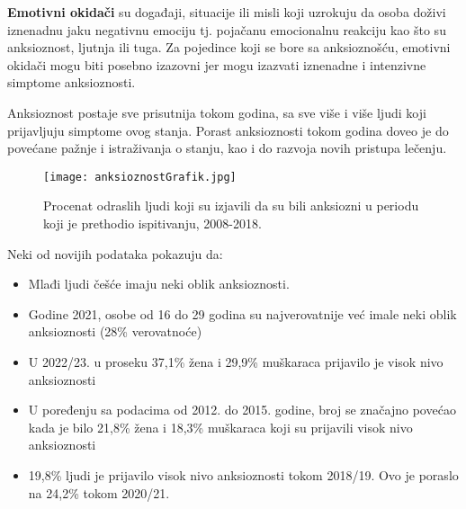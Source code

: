 \documentclass[a4paper]{article}
\begin{document}
                \textbf{Emotivni okidači} su događaji, situacije ili misli koji uzrokuju da osoba doživi iznenadnu jaku negativnu emociju tj. pojačanu emocionalnu reakciju kao što su anksioznost, ljutnja ili tuga. Za pojedince koji se bore sa anksioznošću, emotivni okidači mogu biti posebno izazovni jer mogu izazvati iznenadne i intenzivne simptome anksioznosti.
    
                Anksioznost postaje sve prisutnija tokom godina, sa sve više i više ljudi koji prijavljuju simptome ovog stanja. Porast anksioznosti tokom godina doveo je do povećane pažnje i istraživanja o stanju, kao i do razvoja novih pristupa lečenju. 
    
      
                \begin{figure}[!]
                \caption{ Procenat odraslih ljudi koji su izjavili da su bili anksiozni u periodu koji je prethodio ispitivanju, 2008-2018. \cite{druga}}
                \centering
                \texttt{[image: anksioznostGrafik.jpg]}
                \end{figure}
                
                 Neki od novijih podataka\cite{treca} pokazuju da:
                \begin{itemize}
    		 	\item Mlađi ljudi češće imaju neki oblik anksioznosti.
    		 	\item Godine 2021, osobe od 16 do 29 godina su najverovatnije već imale neki oblik anksioznosti (28\% verovatnoće)
    		 	\item U 2022/23. u proseku 37,1\% žena i 29,9\% muškaraca prijavilo je visok nivo anksioznosti
    		 	\item U poređenju sa podacima od 2012. do 2015. godine, broj se značajno povećao kada je bilo 21,8\% žena i 18,3\% muškaraca koji su prijavili visok nivo anksioznosti
    		 	\item 19,8\% ljudi je prijavilo visok nivo anksioznosti tokom 2018/19. Ovo je poraslo na 24,2\% tokom 2020/21.
    		 
    		 			 	
    		 \end{itemize}  
   		
\end{document}
